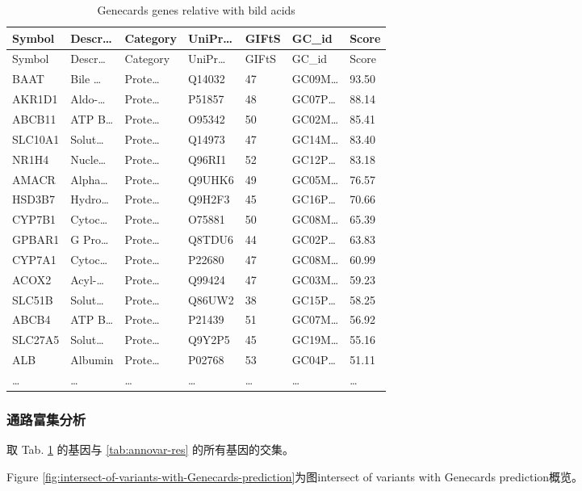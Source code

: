 \documentclass[
]{article}
\begin{document}
\begin{longtable}[]{@{}lllllll@{}}
\caption{\label{tab:Genecards-genes-relative-with-bild-acids}Genecards genes relative with bild acids}\tabularnewline
\toprule
Symbol & Descr\ldots{} & Category & UniPr\ldots{} & GIFtS & GC\_id & Score\tabularnewline
\midrule
\endfirsthead
\toprule
Symbol & Descr\ldots{} & Category & UniPr\ldots{} & GIFtS & GC\_id & Score\tabularnewline
\midrule
\endhead
BAAT & Bile \ldots{} & Prote\ldots{} & Q14032 & 47 & GC09M\ldots{} & 93.50\tabularnewline
AKR1D1 & Aldo-\ldots{} & Prote\ldots{} & P51857 & 48 & GC07P\ldots{} & 88.14\tabularnewline
ABCB11 & ATP B\ldots{} & Prote\ldots{} & O95342 & 50 & GC02M\ldots{} & 85.41\tabularnewline
SLC10A1 & Solut\ldots{} & Prote\ldots{} & Q14973 & 47 & GC14M\ldots{} & 83.40\tabularnewline
NR1H4 & Nucle\ldots{} & Prote\ldots{} & Q96RI1 & 52 & GC12P\ldots{} & 83.18\tabularnewline
AMACR & Alpha\ldots{} & Prote\ldots{} & Q9UHK6 & 49 & GC05M\ldots{} & 76.57\tabularnewline
HSD3B7 & Hydro\ldots{} & Prote\ldots{} & Q9H2F3 & 45 & GC16P\ldots{} & 70.66\tabularnewline
CYP7B1 & Cytoc\ldots{} & Prote\ldots{} & O75881 & 50 & GC08M\ldots{} & 65.39\tabularnewline
GPBAR1 & G Pro\ldots{} & Prote\ldots{} & Q8TDU6 & 44 & GC02P\ldots{} & 63.83\tabularnewline
CYP7A1 & Cytoc\ldots{} & Prote\ldots{} & P22680 & 47 & GC08M\ldots{} & 60.99\tabularnewline
ACOX2 & Acyl-\ldots{} & Prote\ldots{} & Q99424 & 47 & GC03M\ldots{} & 59.23\tabularnewline
SLC51B & Solut\ldots{} & Prote\ldots{} & Q86UW2 & 38 & GC15P\ldots{} & 58.25\tabularnewline
ABCB4 & ATP B\ldots{} & Prote\ldots{} & P21439 & 51 & GC07M\ldots{} & 56.92\tabularnewline
SLC27A5 & Solut\ldots{} & Prote\ldots{} & Q9Y2P5 & 45 & GC19M\ldots{} & 55.16\tabularnewline
ALB & Albumin & Prote\ldots{} & P02768 & 53 & GC04P\ldots{} & 51.11\tabularnewline
\ldots{} & \ldots{} & \ldots{} & \ldots{} & \ldots{} & \ldots{} & \ldots{}\tabularnewline
\bottomrule
\end{longtable}

\hypertarget{ux901aux8defux5bccux96c6ux5206ux6790}{%
\subsubsection{通路富集分析}\label{ux901aux8defux5bccux96c6ux5206ux6790}}

取 Tab. \ref{tab:Genecards-genes-relative-with-bild-acids} 的基因与 \ref{tab:annovar-res} 的所有基因的交集。

Figure \ref{fig:intersect-of-variants-with-Genecards-prediction}为图intersect of variants with Genecards prediction概览。
\end{document}
